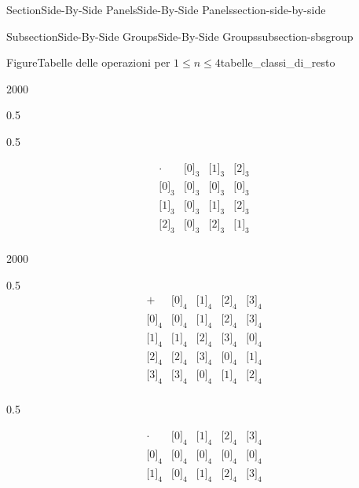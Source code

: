 \documentclass[twoside,10pt,]{article}
\numberwithin{equation}{section}
\newcommand{\class}[2][\sim]{\lbrack #2\rbrack_{#1}}
\newcommand{\amp}{&}
\begin{document}
\begin{sectionptx}{Section}{Side-By-Side Panels}{}{Side-By-Side Panels}{}{}{section-side-by-side}
\begin{subsectionptx}{Subsection}{Side-By-Side Groups}{}{Side-By-Side Groups}{}{}{subsection-sbsgroup}
\begin{figureptx}{Figure}{Tabelle delle operazioni per \(1\le n\le 4\)}{tabelle_classi_di_resto}{}
\begin{sidebyside}{2}{0}{0}{0}
\begin{sbspanel}{0.5}
\begin{equation*}
\end{equation*}
%
\end{sbspanel}%
\begin{sbspanel}{0.5}%
\par
%
\begin{equation*}
\begin{array}{c|ccc}
\cdot \amp \class[3]{0} \amp \class[3]{1} \amp \class[3]{2} \\
\hline
\class[3]{0} \amp \class[3]{0} \amp \class[3]{0} \amp \class[3]{0} \\
\class[3]{1} \amp \class[3]{0} \amp \class[3]{1} \amp \class[3]{2} \\
\class[3]{2} \amp \class[3]{0} \amp \class[3]{2} \amp \class[3]{1} \\
\end{array}
\end{equation*}
%
\end{sbspanel}%
\end{sidebyside}%
\begin{sidebyside}{2}{0}{0}{0}%
\begin{sbspanel}{0.5}%
%
\begin{equation*}
\begin{array}{c|cccc}
+ \amp \class[4]{0} \amp \class[4]{1} \amp \class[4]{2} \amp \class[4]{3} \\
\hline
\class[4]{0} \amp \class[4]{0} \amp \class[4]{1} \amp \class[4]{2} \amp \class[4]{3} \\
\class[4]{1} \amp \class[4]{1} \amp \class[4]{2} \amp \class[4]{3} \amp \class[4]{0} \\
\class[4]{2} \amp \class[4]{2} \amp \class[4]{3} \amp \class[4]{0} \amp \class[4]{1} \\
\class[4]{3} \amp \class[4]{3} \amp \class[4]{0} \amp \class[4]{1} \amp \class[4]{2} \\
\end{array}
\end{equation*}
%
\end{sbspanel}%
\begin{sbspanel}{0.5}%
\par
%
\begin{equation*}
\begin{array}{c|cccc}
\cdot \amp \class[4]{0} \amp \class[4]{1} \amp \class[4]{2} \amp \class[4]{3} \\
\hline
\class[4]{0} \amp \class[4]{0} \amp \class[4]{0} \amp \class[4]{0} \amp \class[4]{0} \\
\class[4]{1} \amp \class[4]{0} \amp \class[4]{1} \amp \class[4]{2} \amp \class[4]{3} \\

\end{array}
\end{equation*}
\end{sbspanel}
\end{sidebyside}
\end{figureptx}
\end{subsectionptx}
\end{sectionptx}
\end{document}

